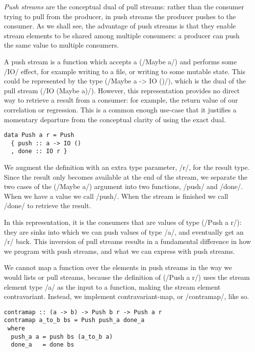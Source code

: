 \emph{Push streams} are the conceptual dual of pull streams: rather than the consumer trying to pull from the producer, in push streams the producer pushes to the consumer.
As we shall see, the advantage of push streams is that they enable stream elements to be shared among multiple consumers: a producer can push the same value to multiple consumers.

A push stream is a function which accepts a (\Hs/Maybe a/) and performs some \Hs/IO/ effect, for example writing to a file, or writing to some mutable state.
This could be represented by the type (\Hs/Maybe a -> IO ()/), which is the dual of the pull stream (\Hs/IO (Maybe a)/).
However, this representation provides no direct way to retrieve a result from a consumer: for example, the return value of our correlation or regression.
This is a common enough use-case that it justifies a momentary departure from the conceptual clarity of using the exact dual.

\begin{lstlisting}
data Push a r = Push
  { push :: a -> IO ()
  , done :: IO r }
\end{lstlisting}

We augment the definition with an extra type parameter, \Hs/r/, for the result type.
Since the result only becomes available at the end of the stream, we separate the two cases of the (\Hs/Maybe a/) argument into two functions, \Hs/push/ and \Hs/done/.
When we have a value we call \Hs/push/.
When the stream is finished we call \Hs/done/ to retrieve the result.


In this representation, it is the consumers that are values of type (\Hs/Push a r/): they are sinks into which we can push values of type \Hs/a/, and eventually get an \Hs/r/ back.
This inversion of pull streams results in a fundamental difference in how we program with push streams, and what we can express with push streams.

We cannot map a function over the elements in push streams in the way we would lists or pull streams, because the definition of (\Hs/Push a r/) uses the stream element type \Hs/a/ as the input to a function, making the stream element contravariant.
Instead, we implement contravariant-map, or \Hs/contramap/, like so.

\begin{lstlisting}
contramap :: (a -> b) -> Push b r -> Push a r
contramap a_to_b bs = Push push_a done_a
 where
  push_a a = push bs (a_to_b a)
  done_a   = done bs
\end{lstlisting}

